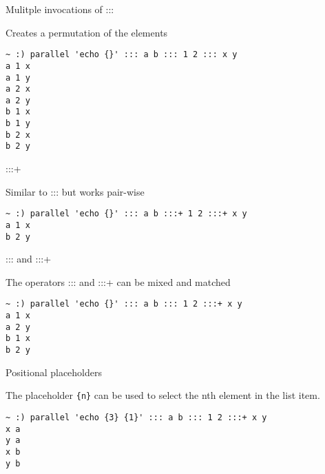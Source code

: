 \documentclass{beamer}
\renewcommand\big[1]{
  \begin{center}
    \Large{#1}
  \end{center}
}
\begin{document}
\begin{frame}[fragile]
\big{Mulitple invocations of :::}
Creates a permutation of the elements
\begin{verbatim}
~ :) parallel 'echo {}' ::: a b ::: 1 2 ::: x y
a 1 x
a 1 y
a 2 x
a 2 y
b 1 x
b 1 y
b 2 x
b 2 y
\end{verbatim}
\end{frame}

\begin{frame}[fragile]
\big{:::+}
Similar to ::: but works pair-wise
\begin{verbatim}
~ :) parallel 'echo {}' ::: a b :::+ 1 2 :::+ x y
a 1 x
b 2 y
\end{verbatim}
\end{frame}

\begin{frame}[fragile]
\big{::: and :::+}
The operators ::: and :::+ can be mixed and matched
\begin{verbatim}
~ :) parallel 'echo {}' ::: a b ::: 1 2 :::+ x y
a 1 x
a 2 y
b 1 x
b 2 y
\end{verbatim}
\end{frame}

\begin{frame}[fragile]
\big{Positional placeholders}
The placeholder \texttt{\{n\}} can be used to select the nth element in the list item.
\begin{verbatim}
~ :) parallel 'echo {3} {1}' ::: a b ::: 1 2 :::+ x y
x a
y a
x b
y b
\end{verbatim}
\end{frame}
\end{document}
